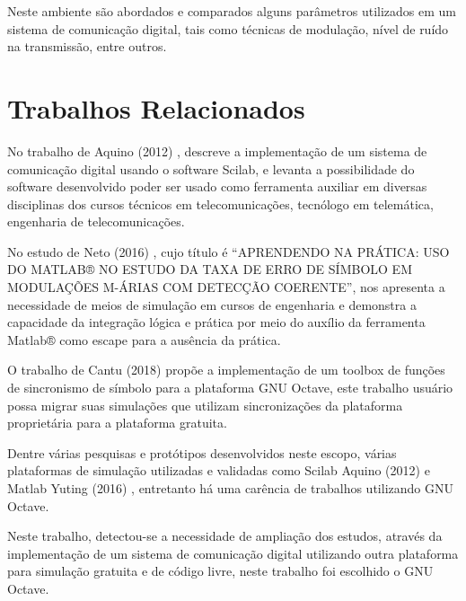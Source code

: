 Neste ambiente são abordados e comparados alguns parâmetros utilizados em um sistema de comunicação digital, tais como técnicas de modulação, nível de ruído na transmissão, entre outros. 

\section{Trabalhos Relacionados }

No trabalho de Aquino (2012) \cite{aquino2012modelo}, descreve a implementação de um sistema de comunicação digital usando o software Scilab, e levanta a possibilidade do software desenvolvido poder ser usado como ferramenta auxiliar em diversas disciplinas dos cursos técnicos em telecomunicações, tecnólogo em telemática, engenharia de telecomunicações. 

No estudo de Neto (2016) \cite{netoaprendendo}, cujo título é “APRENDENDO NA PRÁTICA: USO 
DO MATLAB® NO ESTUDO DA TAXA DE ERRO DE SÍMBOLO EM MODULAÇÕES M-ÁRIAS COM DETECÇÃO COERENTE”, nos apresenta a necessidade de meios de simulação em cursos de engenharia e demonstra a capacidade da integração lógica e prática por meio do auxílio da ferramenta Matlab® como escape para a ausência da prática. 

O trabalho de Cantu (2018) \cite{Cantur:2018:IFSC} propõe a implementação de um toolbox de funções de sincronismo de símbolo para a plataforma GNU Octave, este trabalho usuário possa migrar suas simulações que utilizam sincronizações da plataforma proprietária para a plataforma gratuita. 

Dentre várias pesquisas e protótipos desenvolvidos neste escopo, várias plataformas de simulação utilizadas e validadas como Scilab Aquino (2012)  e Matlab Yuting (2016) \cite{yuting2010simulation}, entretanto há uma carência de trabalhos utilizando GNU Octave. 

Neste trabalho, detectou-se a necessidade de ampliação dos estudos, através da implementação de um sistema de comunicação digital utilizando outra plataforma para simulação gratuita e de código livre, neste trabalho foi escolhido o GNU Octave. 
